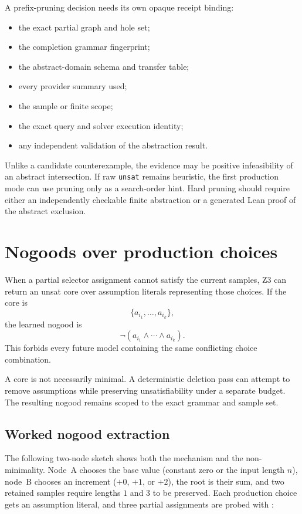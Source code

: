 \documentclass[10pt,letterpaper,oneside]{report}
\newcommand{\code}[1]{\texttt{\detokenize{#1}}}
\newcommand{\unsat}{\texttt{unsat}}
\begin{document}
A prefix-pruning decision needs its own opaque receipt binding:

\begin{itemize}
\item the exact partial graph and hole set;
\item the completion grammar fingerprint;
\item the abstract-domain schema and transfer table;
\item every provider summary used;
\item the sample or finite scope;
\item the exact query and solver execution identity;
\item any independent validation of the abstraction result.
\end{itemize}

Unlike a candidate counterexample, the evidence may be positive infeasibility of an abstract intersection. If raw \unsat{} remains heuristic, the first production mode can use pruning only as a search-order hint. Hard pruning should require either an independently checkable finite abstraction or a generated Lean proof of the abstract exclusion.

\section{Nogoods over production choices}

When a partial selector assignment cannot satisfy the current samples, Z3 can return an unsat core over assumption literals representing those choices. If the core is
\[
  \{a_{i_1},\ldots,a_{i_k}\},
\]
the learned nogood is
\[
  \neg(a_{i_1}\land\cdots\land a_{i_k}).
\]
This forbids every future model containing the same conflicting choice combination.

A core is not necessarily minimal. A deterministic deletion pass can attempt to remove assumptions while preserving unsatisfiability under a separate budget. The resulting nogood remains scoped to the exact grammar and sample set.
\subsection*{Worked nogood extraction}
\label{sec:nogood-worked}

The following two-node sketch shows both the mechanism and the non-minimality. Node~A chooses the base value (constant zero or the input length $n$), node~B chooses an increment ($+0$, $+1$, or $+2$), the root is their sum, and two retained samples require lengths $1$ and $3$ to be preserved. Each production choice gets an assumption literal, and three partial assignments are probed with \code{check-sat-assuming}:
\end{document}
